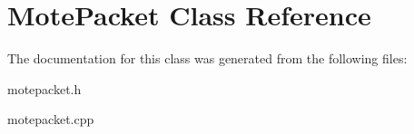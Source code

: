 \hypertarget{classMotePacket}{
\section{MotePacket Class Reference}
\label{classMotePacket}
}


The documentation for this class was generated from the following files:\begin{DoxyCompactItemize}
\item 
motepacket.h\item 
motepacket.cpp\end{DoxyCompactItemize}
